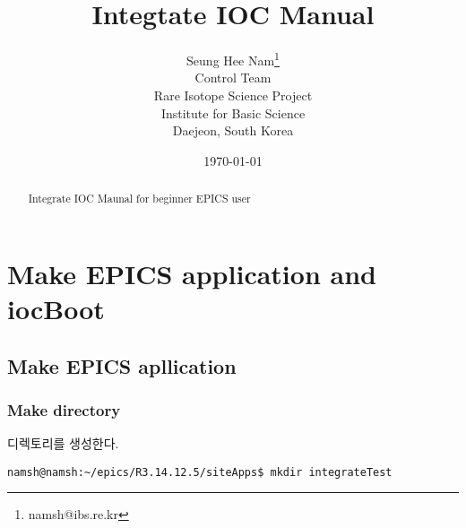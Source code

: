 \documentclass[11pt
  , a4paper
  , article
  , oneside
]{memoir}
\begin{document}
\newcommand{\technumber}{
  RAON Control-Document Series\\
  Revision : v0.1,   Release : 2015.05.08}
\title{\textbf{Integtate IOC Manual}}


\author{Seung Hee Nam\thanks{namsh@ibs.re.kr} \\
  Control Team \\
  Rare Isotope Science Project\\
  Institute for Basic Science\\
  Daejeon, South Korea
}

\date{\today}

\renewcommand{\maketitlehooka}{\begin{flushright}\textsf{\technumber}\end{flushright}}

\maketitle

\begin{abstract}
Integrate IOC Maunal for beginner EPICS user
\end{abstract}



\chapter{Make EPICS application and iocBoot}

\section{Make EPICS apllication}
\subsection{Make directory}
디렉토리를 생성한다.
\begin{lstlisting}[style=termstyle]
namsh@namsh:~/epics/R3.14.12.5/siteApps$ mkdir integrateTest
\end{lstlisting}
\end{document}
